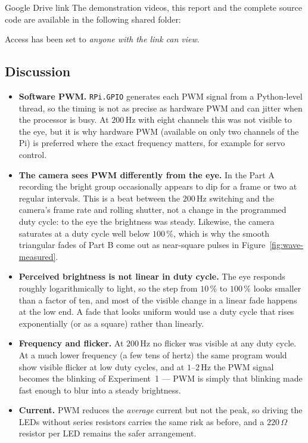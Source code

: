 \documentclass[10pt,a4paper]{article}
\begin{document}
\begin{titledbox}[before skip=6pt]{Google Drive link}
\noindent The demonstration videos, this report and the complete source code are
available in the following shared folder:

\vspace{4pt}
\noindent\drivefolder

\vspace{4pt}
{\small\color{cmnt} Access has been set to \emph{anyone with the link can view}.}
\end{titledbox}

\subsection*{Discussion}
\label{sec:discussion}
\begin{itemize}
  \item \textbf{Software PWM.} \texttt{RPi.GPIO} generates each PWM signal from a
        Python-level thread, so the timing is not as precise as hardware PWM and can
        jitter when the processor is busy. At $200\,\mathrm{Hz}$ with eight channels this
        was not visible to the eye, but it is why hardware PWM (available on only two
        channels of the Pi) is preferred where the exact frequency matters, for example
        for servo control.
  \item \textbf{The camera sees PWM differently from the eye.} In the Part A recording
        the bright group occasionally appears to dip for a frame or two at regular
        intervals. This is a beat between the $200\,\mathrm{Hz}$ switching and the
        camera's frame rate and rolling shutter, not a change in the programmed duty
        cycle: to the eye the brightness was steady. Likewise, the camera saturates at a
        duty cycle well below $100\,\%$, which is why the smooth triangular fades of
        Part B come out as near-square pulses in Figure~\ref{fig:wave-measured}.
  \item \textbf{Perceived brightness is not linear in duty cycle.} The eye responds
        roughly logarithmically to light, so the step from $10\,\%$ to $100\,\%$ looks
        smaller than a factor of ten, and most of the visible change in a linear fade
        happens at the low end. A fade that looks uniform would use a duty cycle that
        rises exponentially (or as a square) rather than linearly.
  \item \textbf{Frequency and flicker.} At $200\,\mathrm{Hz}$ no flicker was visible at any
        duty cycle. At a much lower frequency (a few tens of hertz) the same program would
        show visible flicker at low duty cycles, and at $1$--$2\,\mathrm{Hz}$ the PWM signal
        becomes the blinking of Experiment~1 --- PWM is simply that blinking made fast
        enough to blur into a steady brightness.
  \item \textbf{Current.} PWM reduces the \emph{average} current but not the peak, so
        driving the LEDs without series resistors carries the same risk as before, and a
        $220\,\Omega$ resistor per LED remains the safer arrangement.
\end{itemize}
\end{document}
